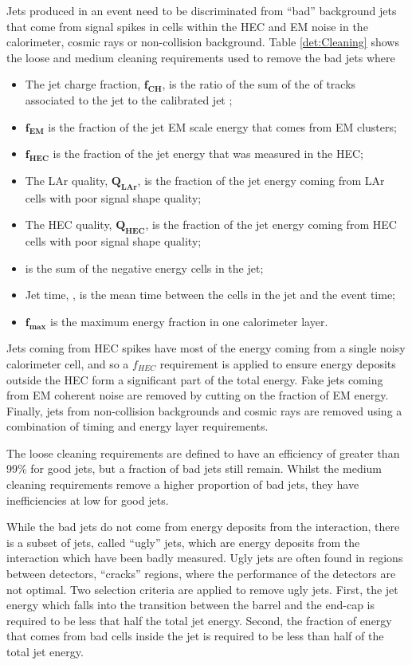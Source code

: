 Jets produced in an event need to be discriminated from ``bad'' background jets that come from  signal spikes in cells within the HEC and EM noise in the calorimeter, cosmic rays or non-collision background.
Table \ref{det:Cleaning} shows the loose and medium cleaning requirements used to remove the bad jets where
\begin{itemize}
  \item The jet charge fraction, $\mathbf{f_{CH}}$, is the ratio of the sum of the \pt{} of tracks associated to the jet to the calibrated jet \pt{};
  \item  $\mathbf{f_{EM}}$ is the fraction of the jet EM scale energy that comes from EM clusters;
  \item  $\mathbf{f_{HEC}}$ is the fraction of the jet energy that was measured in the HEC;
  \item The LAr quality, $\mathbf{Q_{LAr}}$, is the fraction of the jet energy coming from LAr cells with poor signal shape quality;
  \item The HEC quality, $\mathbf{Q_{HEC}}$, is the fraction of the jet energy coming from HEC cells with poor signal shape quality;
  \item {} is the sum of the negative energy cells in the jet;
  \item Jet time, , is the mean time between the cells in the jet and the event time;
  \item $\mathbf{f_{max}}$ is the maximum energy fraction in one calorimeter layer.
\end{itemize}

Jets coming from HEC spikes have most of the energy coming from a single noisy calorimeter cell, and so a $f_{HEC}$ requirement is applied to ensure energy deposits outside the HEC form a significant part of the total energy.
Fake jets coming from EM coherent noise are removed by cutting on the fraction of EM energy.
Finally, jets from non-collision backgrounds and cosmic rays are removed using a combination of timing and energy layer requirements.

The loose cleaning requirements are defined to have an efficiency of greater than 99\% for good jets, but a fraction of bad jets still remain. 
Whilst the medium cleaning requirements remove a higher proportion of bad jets, they have inefficiencies at low \pt{} for good jets. 

While the bad jets do not come from energy deposits from the interaction, there is a subset of jets, called ``ugly'' jets, which are energy deposits from the interaction which have been badly measured. 
Ugly jets are often found in regions between detectors, ``cracks'' regions, where the performance of the detectors are not optimal.
Two selection criteria are applied to remove ugly jets.
First, the jet energy which falls into the transition between the barrel and the end-cap is required to be less that half the total jet energy.
Second, the fraction of energy that comes from bad cells inside the jet is required to be less than half of the total jet energy.


